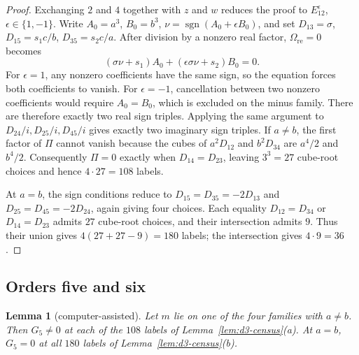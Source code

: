 \documentclass[11pt]{amsart}
\newtheorem{lemma}[theorem]{Lemma}
\theoremstyle{definition}
\theoremstyle{remark}
\begin{document}
{\begin{proof}
Exchanging $2$ and $4$ together with $z$ and $w$ reduces the proof to
$E_{12}^{\epsilon}$, $\epsilon\in\{1,-1\}$.
Write $A_0=a^3$, $B_0=b^3$, $\nu=\operatorname{sgn}(A_0+\epsilon B_0)$,
and set $D_{13}=\sigma$, $D_{15}=s_1c/b$, $D_{35}=s_2c/a$.
After division by a nonzero real factor, $\Omega_{\mathrm{re}}=0$ becomes
\[
 (\sigma\nu+s_1)A_0+(\epsilon\sigma\nu+s_2)B_0=0.
\]
For $\epsilon=1$, any nonzero coefficients have the same sign, so the equation
forces both coefficients to vanish. For $\epsilon=-1$, cancellation between two nonzero
coefficients would require $A_0=B_0$, which is excluded on the minus family.
There are therefore exactly two real sign triples. Applying the same argument
to $D_{24}/i,D_{25}/i,D_{45}/i$ gives exactly two imaginary sign triples.
If $a\ne b$, the first factor of $\Pi$ cannot vanish because the cubes of
$a^2D_{12}$ and $b^2D_{34}$ are $a^4/2$ and $b^4/2$.
Consequently $\Pi=0$ exactly when $D_{14}=D_{23}$, leaving $3^3=27$ cube-root
choices and hence $4\cdot27=108$ labels.

At $a=b$, the sign conditions reduce to
$D_{15}=D_{35}=-2D_{13}$ and $D_{25}=D_{45}=-2D_{24}$, again giving four choices.
Each equality $D_{12}=D_{34}$ or $D_{14}=D_{23}$ admits $27$ cube-root choices,
and their intersection admits $9$. Thus their union gives
$4(27+27-9)=180$ labels; the intersection gives $4\cdot9=36$.
\end{proof}

}\subsection{Orders five and six}

\begin{lemma}[computer-assisted]\label{lem:d3-order5}
Let $m$ lie on one of the four families with $a\ne b$.  Then $G_5\neq0$ at each of the $108$
labels of Lemma~\ref{lem:d3-census}(a).  At $a=b$, $G_5=0$ at all $180$ labels of
Lemma~\ref{lem:d3-census}(b).
\end{lemma}
\end{document}
